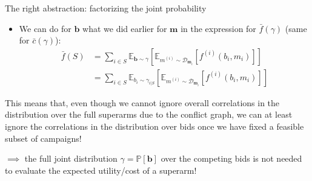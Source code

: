 \begin{frame}{The right abstraction: factorizing the joint probability}
    \begin{itemize}    
        \item We can do for $\mathbf{b}$ what we did earlier for $\mathbf{m}$ in the expression for $\bar{f}(\gamma)$ (same for $\bar{c}(\gamma)$):
        \begin{equation*}
            \begin{aligned}
                \bar{f}(S) &= \sum_{i \in S} \mathbb{E}_{\mathbf{b} \sim \gamma}\left[ \mathbb{E}_{m^{(i)} \sim \mathcal{D}_{\mathbf{m}_i}}\left[ f^{(i)}(b_i, m_i) \right] \right] \\
                &= \sum_{i \in S} \mathbb{E}_{b_i \sim \gamma_{i|S}}\left[ \mathbb{E}_{m^{(i)} \sim \mathcal{D}_{\mathbf{m}_i}}\left[ f^{(i)}(b_i, m_i) \right] \right]
            \end{aligned}
        \end{equation*}
    \end{itemize}

    \begin{block}{}
        This means that, even though we cannot ignore overall correlations in the distribution over the full superarms due to the conflict graph, we can at least ignore the correlations in the distribution over bids once we have fixed a feasible subset of campaigns! 
    \end{block}
    $\implies$ the full joint distribution $\gamma = \mathbb{P}\left[ \mathbf{b} \right]$ over the competing bids
    is not needed to evaluate the expected utility/cost of a superarm!
\end{frame}

